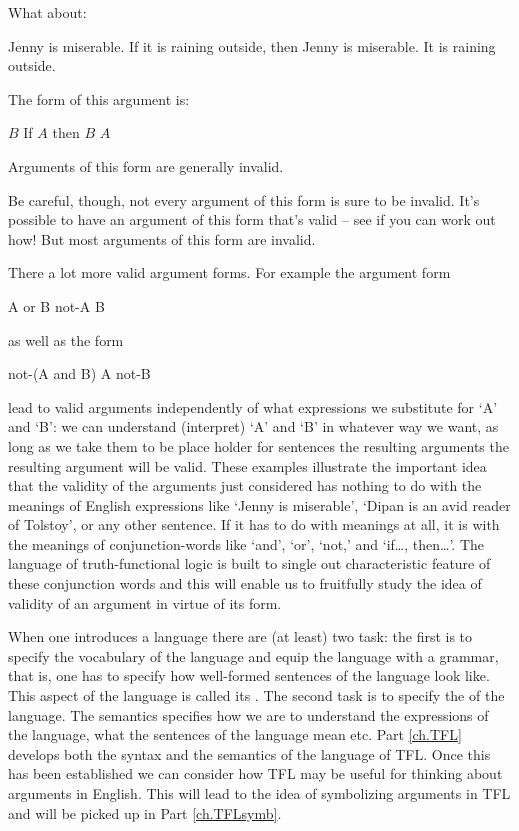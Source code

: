 What about:
	\begin{earg}
		\prem Jenny is miserable.
		\prem If it is raining outside, then Jenny is miserable.
		\conc It is raining outside.
	\end{earg}
The form of this argument is:
\begin{earg}
\prem	$B$
\prem	If $A$ then $B$
\conc $A$
\end{earg}
Arguments of this form are generally invalid.

Be careful, though, not every argument of this form is sure to be invalid.
It’s possible to have an argument of this form that’s valid – see if you can work out how!
But most arguments of this form are invalid.

There a lot more valid argument forms. For example the
argument form
	\begin{earg}
		\prem A or B
		\prem not-A
		\conc B
	\end{earg}
as well as the form
	\begin{earg}
		\prem not-(A and B)
		\prem A
		\conc not-B
	\end{earg}
lead to valid arguments independently of what expressions we substitute for `A' and `B': we can understand (interpret) `A' and `B' in whatever way we want, as long as we take them to be place holder for sentences the resulting arguments the resulting argument will be valid. These examples illustrate the important idea that the validity of the arguments just considered has nothing to do with the meanings of English expressions like `Jenny is miserable', `Dipan is an avid reader of Tolstoy', or any other sentence. If it has to do with meanings at all, it is with the meanings of conjunction-words like `and', `or', `not,' and `if\ldots, then\ldots'. The language of truth-functional logic is built to single out characteristic feature of these conjunction words and this will enable us to fruitfully study the idea of validity of an argument in virtue of its form.

When one introduces a language there are (at least) two task: the first is to specify the vocabulary of the language and equip the language with a grammar, that is, one has to specify how well-formed sentences of the language look like. This aspect of the language is called its . The second task is to specify the  of the language. The semantics specifies how we are to understand the expressions of the language, what the sentences of the language mean etc. Part \ref{ch.TFL} develops both the syntax and the semantics of the language of TFL. Once this has been established we can consider how TFL may be useful for thinking about arguments in English. This will lead to the idea of symbolizing arguments in TFL and will be picked up in Part \ref{ch.TFLsymb}.

